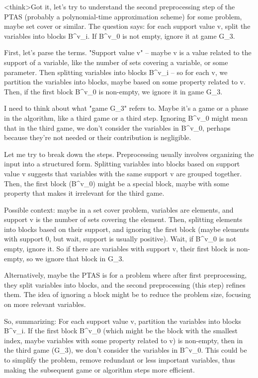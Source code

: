 <think>Got it, let's try to understand the second preprocessing step of the PTAS (probably a polynomial-time approximation scheme) for some problem, maybe set cover or similar. The question says: for each support value v, split the variables into blocks B^v_i. If B^v_0 is not empty, ignore it at game G_3. 

First, let's parse the terms. "Support value v" – maybe v is a value related to the support of a variable, like the number of sets covering a variable, or some parameter. Then splitting variables into blocks B^v_i – so for each v, we partition the variables into blocks, maybe based on some property related to v. Then, if the first block B^v_0 is non-empty, we ignore it in game G_3. 

I need to think about what "game G_3" refers to. Maybe it's a game or a phase in the algorithm, like a third game or a third step. Ignoring B^v_0 might mean that in the third game, we don't consider the variables in B^v_0, perhaps because they're not needed or their contribution is negligible. 

Let me try to break down the steps. Preprocessing usually involves organizing the input into a structured form. Splitting variables into blocks based on support value v suggests that variables with the same support v are grouped together. Then, the first block (B^v_0) might be a special block, maybe with some property that makes it irrelevant for the third game. 

Possible context: maybe in a set cover problem, variables are elements, and support v is the number of sets covering the element. Then, splitting elements into blocks based on their support, and ignoring the first block (maybe elements with support 0, but wait, support is usually positive). Wait, if B^v_0 is not empty, ignore it. So if there are variables with support v, their first block is non-empty, so we ignore that block in G_3. 

Alternatively, maybe the PTAS is for a problem where after first preprocessing, they split variables into blocks, and the second preprocessing (this step) refines them. The idea of ignoring a block might be to reduce the problem size, focusing on more relevant variables. 

So, summarizing: For each support value v, partition the variables into blocks B^v_i. If the first block B^v_0 (which might be the block with the smallest index, maybe variables with some property related to v) is non-empty, then in the third game (G_3), we don't consider the variables in B^v_0. This could be to simplify the problem, remove redundant or less important variables, thus making the subsequent game or algorithm steps more efficient. 

